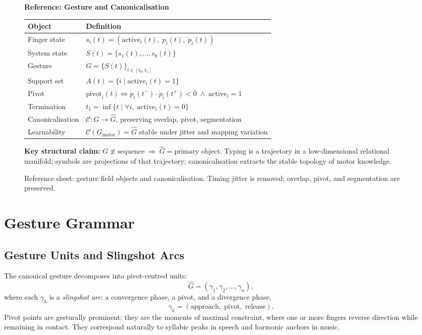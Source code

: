 \documentclass[11pt, a4paper]{article}
\begin{document}
\begin{figure}[H]
\centering
\small
\begin{minipage}{0.95\textwidth}
\textbf{Reference: Gesture and Canonicalisation}
\medskip

\begin{tabular}{@{}p{3.6cm}p{9.8cm}@{}}
\toprule
\textbf{Object} & \textbf{Definition} \\
\midrule
Finger state & $s_i(t) = (\mathrm{active}_i(t),\;p_i(t),\;\dot{p}_i(t))$ \\
System state & $S(t) = \{s_1(t),\dots,s_8(t)\}$ \\
Gesture & $G = \{S(t)\}_{t\in[t_0,t_1]}$ \\
Support set & $A(t) = \{i\mid\mathrm{active}_i(t)=1\}$ \\
Pivot & $\mathrm{pivot}_i(t)\iff\dot{p}_i(t^-)\cdot\dot{p}_i(t^+)<0\;\wedge\;\mathrm{active}_i=1$ \\
Termination & $t_1=\inf\{t\mid\forall i,\;\mathrm{active}_i(t)=0\}$ \\
Canonicalisation & $\mathcal{C}:G\to\hat{G}$, preserving overlap, pivot, segmentation \\
Learnability & $\mathcal{C}(G_{\mathrm{motor}})=\hat{G}$ stable under jitter and mapping variation \\
\bottomrule
\end{tabular}

\medskip
\textbf{Key structural claim:}
$G \not\equiv \text{sequence}
\;\Longrightarrow\;
\hat{G} = \text{primary object}$.
Typing is a trajectory in a low-dimensional relational manifold; symbols are
projections of that trajectory; canonicalisation extracts the stable topology
of motor knowledge.
\end{minipage}
\caption{Reference sheet: gesture field objects and canonicalisation.
Timing jitter is removed; overlap, pivot, and segmentation are preserved.}
\label{fig:cheat-gesture}
\end{figure}

\section{Gesture Grammar}

\subsection{Gesture Units and Slingshot Arcs}

The canonical gesture decomposes into pivot-centred units:
\[
  \hat{G} = (\gamma_1, \gamma_2, \ldots, \gamma_n),
\]
where each $\gamma_k$ is a \emph{slingshot arc}: a convergence phase, a
pivot, and a divergence phase,
\[
  \gamma_k = (\mathrm{approach},\; \mathrm{pivot},\; \mathrm{release}).
\]
Pivot points are gesturally prominent: they are the moments of maximal
constraint, where one or more fingers reverse direction while remaining
in contact. They correspond naturally to syllabic peaks in speech and
harmonic anchors in music.
\end{document}
